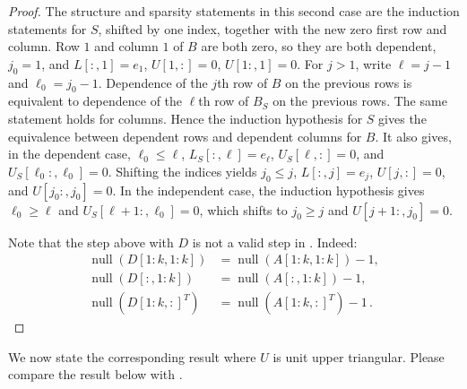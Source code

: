 \documentclass[final]{siamart1116}
\numberwithin{theorem}{section}
\DeclareMathOperator{\nl}{null}
\begin{document}
\begin{proof}
  The structure and sparsity statements in this second case are the induction statements for $S$, shifted by one index, together with the new zero first row and column. Row $1$ and column $1$ of $B$ are both zero, so they are both dependent, $j_0=1$, and $L[:,1]=e_1$, $U[1,:]=0$, $U[1:,1]=0$. For $j>1$, write $\ell=j-1$ and $\ell_0=j_0-1$. Dependence of the $j$th row of $B$ on the previous rows is equivalent to dependence of the $\ell$th row of $B_S$ on the previous rows. The same statement holds for columns. Hence the induction hypothesis for $S$ gives the equivalence between dependent rows and dependent columns for $B$. It also gives, in the dependent case, $\ell_0\le \ell$, $L_S[:,\ell]=e_\ell$, $U_S[\ell,:]=0$, and $U_S[\ell_0:,\ell_0]=0$. Shifting the indices yields $j_0\le j$, $L[:,j]=e_j$, $U[j,:]=0$, and $U[j_0:,j_0]=0$. In the independent case, the induction hypothesis gives $\ell_0\ge\ell$ and $U_S[\ell+1:,\ell_0]=0$, which shifts to $j_0\ge j$ and $U[j+1:,j_0]=0$.

  Note that the step above with $D$ is not a valid step in . Indeed:
  \begin{align*}
    \nl(D[1:k,1:k])   & = \nl(A[1:k,1:k]) - 1, \\
    \nl(D[:,1:k])     & = \nl(A[:,1:k]) - 1, \\
    \nl({D[1:k,:]}^T) & = \nl({A[1:k,:]}^T) - 1 \,.
  \end{align*}
\end{proof}

We now state the corresponding result where $U$ is unit upper triangular. Please compare the result below with .
\end{document}
